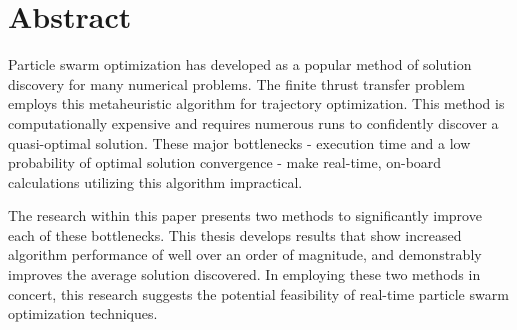 
\cleardoublepage
\thispagestyle{empty} %

\chapter*{Abstract} %

\noindent Particle swarm optimization has developed as a popular method of solution 
discovery for many numerical problems. The finite thrust transfer problem employs
this metaheuristic algorithm for trajectory optimization.  This method is computationally expensive and requires
numerous runs to confidently discover a quasi-optimal solution. These major bottlenecks - execution time and 
a low probability of optimal solution convergence - make real-time, on-board calculations utilizing this algorithm 
impractical. \newline

\noindent The research within this paper presents two methods to significantly improve each of these bottlenecks.
This thesis develops results that show increased algorithm performance of well over an order of magnitude, and demonstrably
improves the average solution discovered. In employing these two methods in concert, this
research suggests the potential feasibility of real-time particle swarm optimization techniques.\newline

\cleardoublepage
